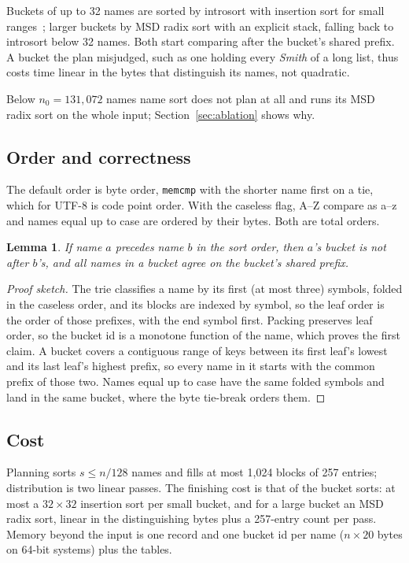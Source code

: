 \documentclass[11pt]{article}
\newtheorem{lemma}{Lemma}
\theoremstyle{definition}
\begin{document}
Buckets of up to 32 names are sorted by introsort with insertion sort for
small ranges~\cite{musser1997introsort}; larger buckets by MSD radix sort
with an explicit stack, falling back to introsort below 32 names. Both start
comparing after the bucket's shared prefix. A bucket the plan misjudged, such
as one holding every \emph{Smith} of a long list, thus costs time linear in
the bytes that distinguish its names, not quadratic.

Below $n_0 = 131{,}072$ names name sort does not plan at all and runs its MSD
radix sort on the whole input; Section~\ref{sec:ablation} shows why.

\subsection{Order and correctness}

The default order is byte order, \texttt{memcmp} with the shorter name first
on a tie, which for UTF-8 is code point order. With the caseless flag, A--Z
compare as a--z and names equal up to case are ordered by their bytes. Both
are total orders.

\begin{lemma}
If name $a$ precedes name $b$ in the sort order, then $a$'s bucket is not
after $b$'s, and all names in a bucket agree on the bucket's shared prefix.
\end{lemma}
\begin{proof}[Proof sketch]
The trie classifies a name by its first (at most three) symbols, folded in
the caseless order, and its blocks are indexed by symbol, so the leaf order
is the order of those prefixes, with the end symbol first. Packing preserves
leaf order, so the bucket id is a monotone function of the name, which
proves the first claim. A bucket covers a contiguous range of keys between
its first leaf's lowest and its last leaf's highest prefix, so every name in
it starts with the common prefix of those two. Names equal up to case have
the same folded symbols and land in the same bucket, where the byte
tie-break orders them.
\end{proof}

\subsection{Cost}

Planning sorts $s \le n/128$ names and fills at most 1{,}024 blocks of 257
entries; distribution is two linear passes. The finishing cost is that of
the bucket sorts: at most a $32\times32$ insertion sort per small bucket, and
for a large bucket an MSD radix sort, linear in the distinguishing bytes plus
a 257-entry count per pass. Memory beyond the input is one record and one
bucket id per name ($n \times 20$ bytes on 64-bit systems) plus the tables.
\end{document}
